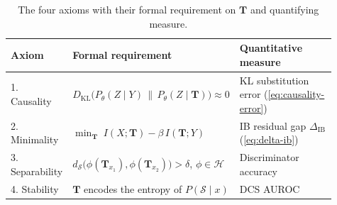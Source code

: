 \begin{table}[!htbp]
  \caption{The four axioms with their formal requirement on $\mathbf{T}$ and quantifying measure.}
  \label{tab:axiom-summary}
  \centering
  \footnotesize
  \setlength{\tabcolsep}{6pt}
  \renewcommand{\arraystretch}{1.2}
  \begin{tabular}{@{}p{0.14\linewidth} p{0.45\linewidth} p{0.32\linewidth}@{}}
    \toprule
    \textbf{Axiom} & \textbf{Formal requirement} & \textbf{Quantitative measure} \\
    \midrule
    1. Causality      & $D_{\mathrm{KL}}\big(P_\theta(Z \mid Y) \,\|\, P_\theta(Z \mid \mathbf{T})\big) \approx 0$  & KL substitution error (\cref{eq:causality-error}) \\
    2. Minimality     & $\min_{\mathbf{T}}\; I(X;\mathbf{T}) - \beta\, I(\mathbf{T};Y)$  & IB residual gap $\Delta_{\mathrm{IB}}$ (\cref{eq:delta-ib}) \\
    3. Separability   & $d_\mathcal{S}\big(\phi(\mathbf{T}_{x_1}), \phi(\mathbf{T}_{x_2})\big) > \delta$, $\phi \in \mathcal{H}$  & Discriminator accuracy \\
    4. Stability      & $\mathbf{T}$ encodes the entropy of $P(\mathcal{S} \mid x)$  & DCS AUROC \\
    \bottomrule
  \end{tabular}
\end{table}
